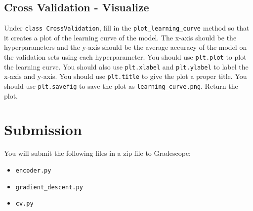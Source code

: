 \documentclass{article}
\begin{document}
\subsection{ Cross Validation - Visualize}

Under \verb|class CrossValidation|, fill in the \verb|plot_learning_curve| method so that it creates a plot of the learning curve of the model. The x-axis should be the hyperparameters and the y-axis should be the average accuracy of the model on the validation sets using each hyperparameter. You should use \verb|plt.plot| to plot the learning curve. You should also use \verb|plt.xlabel| and \verb|plt.ylabel| to label the x-axis and y-axis. You should use \verb|plt.title| to give the plot a proper title. You should use \verb|plt.savefig| to save the plot as \verb|learning_curve.png|. Return the plot. 

\section*{Submission}

You will submit the following files in a zip file to Gradescope:
\begin{itemize}
    \item \verb|encoder.py|
    \item \verb|gradient_descent.py| 
    \item \verb|cv.py|
\end{itemize}
\end{document}
